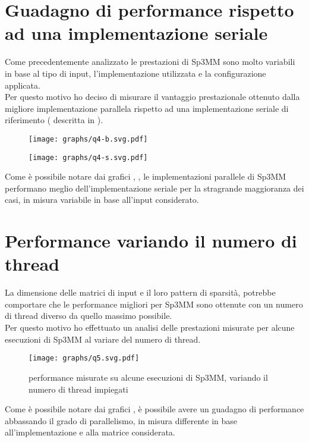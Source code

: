 \section{Guadagno di performance rispetto ad una implementazione seriale} \label{chPerf:allMatrixs}
Come precedentemente analizzato le prestazioni di Sp3MM sono molto variabili in base al tipo di input, 
l'implementazione utilizzata e la configurazione applicata.\\
Per questo motivo ho deciso di misurare il vantaggio prestazionale ottenuto dalla migliore implementazione parallela 
rispetto ad una implementazione seriale di riferimento ( descritta in  ).\\
\begin{figure}[H]
  \centering \texttt{[image: graphs/q4-b.svg.pdf]}
  \caption[Migliore implementazione parallela VS seriale - 1]
  \decoRule \label{fig:q4big}
\end{figure}
\begin{figure}[H]
  \centering \texttt{[image: graphs/q4-s.svg.pdf]}
  \caption[Migliore implementazione parallela VS seriale - 2]
  \decoRule \label{fig:q4small}
\end{figure}
Come è possibile notare dai grafici , , le implementazioni 
parallele di Sp3MM performano meglio dell'implementazione seriale per la stragrande maggioranza dei casi,
in misura variabile in base all'input considerato.\\

\section{Performance variando il numero di thread}	\label{chPerf:multiThread}
La dimensione delle matrici di input e il loro pattern di sparsità,
potrebbe comportare che le performance migliori per Sp3MM sono ottenute con un numero di thread diverso da quello massimo possibile.\\
Per questo motivo ho effettuato un analisi delle prestazioni misurate per alcune esecuzioni di Sp3MM
al variare del numero di thread.\\
\begin{figure}[H]
  \centering \texttt{[image: graphs/q5.svg.pdf]}
  \caption[performance Sp3MM variando il numero di thread]
  {performance misurate su alcune esecuzioni di Sp3MM, variando il numero di thread impiegati}
  \decoRule \label{fig:q5}
\end{figure}
Come è possibile notare dai grafici , è possibile avere un guadagno di performance 
abbassando il grado di parallelismo, in misura differente in base all'implementazione e alla matrice considerata.\\


